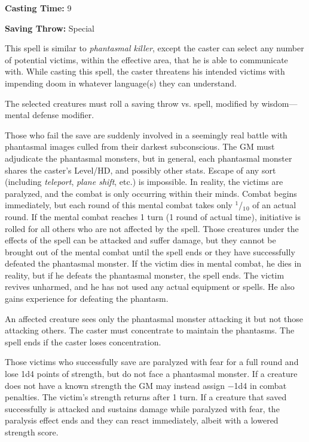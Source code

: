 \begin{multicols}{2}
\begin{minipage}{\columnwidth}
\noindent \textbf{Casting Time:} 9

\noindent \textbf{Saving Throw:} Special

\end{minipage}

This spell is similar to \textit{phantasmal killer}, except the caster can select any number of potential victims, within the effective area, that he is able to communicate with.  While casting this spell, the caster threatens his intended victims with impending doom in whatever language(s) they can understand.  

The selected creatures must roll a saving throw vs. spell, modified by wisdom---mental defense modifier.  

Those who fail the save are suddenly involved in a seemingly real battle with phantasmal images culled from their darkest subconscious.  The GM must adjudicate the phantasmal monsters, but in general, each phantasmal monster shares the caster's Level/HD, and possibly other stats.  Escape of any sort (including \textit{teleport}, \textit{plane shift}, etc.) is impossible.  In reality, the victims are paralyzed, and the combat is only occurring within their minds.  Combat begins immediately, but each round of this mental combat takes only $^1$/$_1$$_0$ of an actual round.  If the mental combat reaches 1 turn (1 round of actual time), initiative is rolled for all others who are not affected by the spell.  Those creatures under the effects of the spell can be attacked and suffer damage, but they cannot be brought out of the mental combat until the spell ends or they have successfully defeated the phantasmal monster.  If the victim dies in mental combat, he dies in reality, but if he defeats the phantasmal monster, the spell ends.  The victim revives unharmed, and he has not used any actual equipment or spells.  He also gains experience for defeating the phantasm.  

An affected creature sees only the phantasmal monster attacking it but not those attacking others.  The caster must concentrate to maintain the phantasms.  The spell ends if the caster loses concentration.

Those victims who successfully save are paralyzed with fear for a full round and lose 1d4 points of strength, but do not face a phantasmal monster.  If a creature does not have a known strength the GM may instead assign $-$1d4 in combat penalties.  The victim's strength returns after 1 turn.  If a creature that saved successfully is attacked and sustains damage while paralyzed with fear, the paralysis effect ends and they can react immediately, albeit with a lowered strength score.  


\end{multicols}
